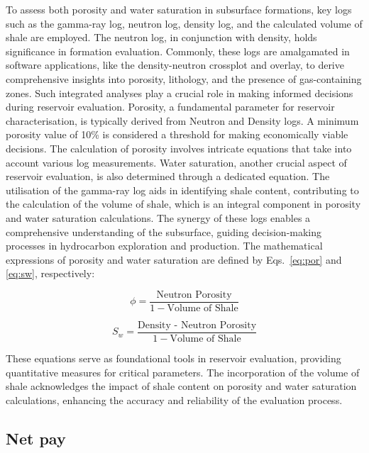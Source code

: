 \documentclass{gji}
\begin{document}
To assess both porosity and water saturation in subsurface formations, key logs such as the gamma-ray log, neutron log, density log, and the calculated volume of shale are employed.
The neutron log, in conjunction with density, holds significance in formation evaluation. 
Commonly, these logs are amalgamated in software applications, like the density-neutron crossplot and overlay, to derive comprehensive insights into porosity, lithology, and the presence of gas-containing zones.
Such integrated analyses play a crucial role in making informed decisions during reservoir evaluation.
Porosity, a fundamental parameter for reservoir characterisation, is typically derived from Neutron and Density logs. 
A minimum porosity value of 10\% is considered a threshold for making economically viable decisions.
The calculation of porosity involves intricate equations that take into account various log measurements.
Water saturation, another crucial aspect of reservoir evaluation, is also determined through a dedicated equation.
The utilisation of the gamma-ray log aids in identifying shale content, contributing to the calculation of the volume of shale, which is an integral component in porosity and water saturation calculations.
The synergy of these logs enables a comprehensive understanding of the subsurface, guiding decision-making processes in hydrocarbon exploration and production.
The mathematical expressions of porosity and water saturation are defined by Eqs.~\eqref{eq:por} and \eqref{eq:sw}, respectively:

 \begin{equation}\label{eq:por}
 \phi = \frac{{\text{Neutron Porosity}}}{{1 - \text{Volume of Shale}}} \end{equation}
 
\begin{equation}\label{eq:sw} S_w = \frac{{\text{Density - Neutron Porosity}}}{{1 - \text{Volume of Shale}}}\end{equation}

\noindent These equations serve as foundational tools in reservoir evaluation, providing quantitative measures for critical parameters.
The incorporation of the volume of shale acknowledges the impact of shale content on porosity and water saturation calculations, enhancing the accuracy and reliability of the evaluation process.

\subsection{Net pay} \label{subsec:net}
\end{document}
